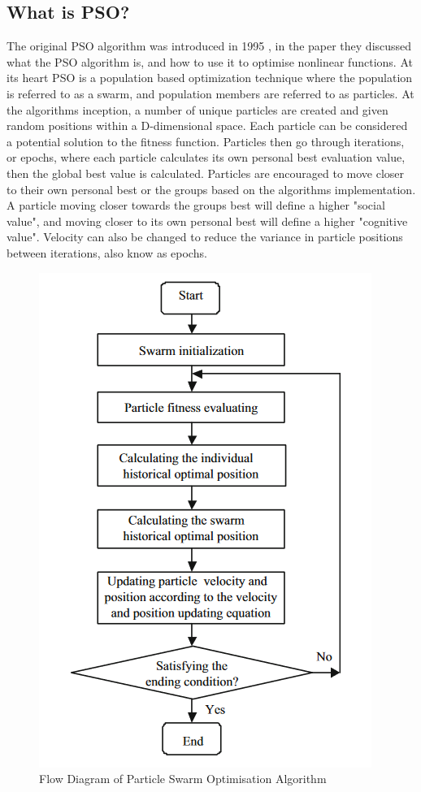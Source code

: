 \documentclass[oneside,12pt]{book}
\begin{document}
\subsection{What is PSO?}
The original PSO algorithm was introduced in 1995 \cite{kennedy1995particle}, in the paper they discussed what the PSO algorithm is, and how to use it to optimise nonlinear functions. At its heart PSO is a population based optimization technique where the population is referred to as a swarm, and population members are referred to as particles. At the algorithms inception, a number of unique particles are created and given random positions within a D-dimensional space. Each particle can be considered a potential solution to the fitness function. Particles then go through iterations, or epochs, where each particle calculates its own personal best evaluation value, then the global best value is calculated. Particles are encouraged to move closer to their own personal best or the groups based on the algorithms implementation. A particle moving closer towards the groups best will define a higher "social value", and moving closer to its own personal best will define a higher "cognitive value". Velocity can also be changed to reduce the variance in particle positions between iterations, also know as epochs. 
\begin{figure}[H]
    \centering
    \includegraphics[scale=0.6]{Images/PSO_Flow.png}
    \caption{Flow Diagram of Particle Swarm Optimisation Algorithm \protect\cite{wang_tan_liu_2017}}
    \label{fig:Flow Diagram of Particle Swarm Optimisation Algorithm}
\end{figure}
\end{document}
